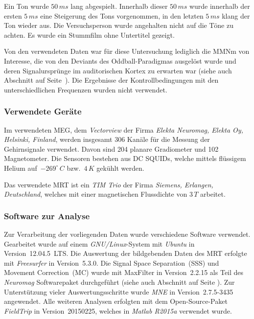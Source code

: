 \documentclass[doc,a4paper,12pt]{apa6}
\makeatletter
\DeclareRobustCommand*{\nameref}[1]{%
      \glqq{\myorg@nameref{#1}}\grqq%
    }%
\makeatother
\begin{document}
Ein Ton wurde $50\,ms$ lang abgespielt. Innerhalb dieser $50\,ms$ wurde innerhalb der ersten $5\,ms$ eine Steigerung des Tons vorgenommen, in den letzten $5\,ms$ klang der Ton wieder aus. Die Versuchsperson wurde angehalten nicht auf die Töne zu achten. Es wurde ein Stummfilm ohne Untertitel gezeigt.

Von den verwendeten Daten war für diese Untersuchung lediglich die MMNm von Interesse, die von den Deviants des Oddball-Paradigmas ausgelöst wurde und deren Signalursprünge im auditorischen Kortex zu erwarten war (siehe auch Abschnitt \nameref{sec:audicort} auf Seite~\pageref{sec:audicort}). Die Ergebnisse der Kontrollbedingungen mit den unterschiedlichen Frequenzen wurden nicht verwendet.

\subsubsection{Verwendete Geräte}

Im verwendeten MEG, dem \emph{Vectorview} der Firma \emph{Elekta Neuromag, Elekta Oy, Helsinki, Finland}, werden insgesamt 306 Kanäle für die Messung der Gehirnsignale verwendet. Davon sind 204 planare Gradiometer und 102 Magnetometer. Die Sensoren bestehen aus DC SQUIDs, welche mittels flüssigem Helium auf~$-269^\circ\,C$ bzw.~$4\,K$ gekühlt werden.

Das verwendete MRT ist ein \emph{TIM Trio} der Firma \emph{Siemens, Erlangen, Deutschland}, welches mit einer magnetischen Flussdichte von $3\,T$ arbeitet.

\subsubsection{Software zur Analyse}
\label{sec:software}

Zur Verarbeitung der vorliegenden Daten wurde verschiedene Software verwendet. Gearbeitet wurde auf einem \emph{GNU/Linux}-System mit \emph{Ubuntu} in Version~12.04.5~LTS. Die Auswertung der bildgebenden Daten des MRT erfolgte mit \emph{Freesurfer} in Version~5.3.0. Die Signal Space Separation~(SSS) und Movement Correction~(MC) wurde mit MaxFilter in Version~2.2.15 als Teil des \emph{Neuromag} Softwarepaket durchgeführt (siehe auch Abschnitt \nameref{sec:maxfilter} auf Seite \pageref{sec:maxfilter}). Zur Unterstützung vieler Auswertungsschritte wurde \emph{MNE} in Version~2.7.5-3435 angewendet. Alle weiteren Analysen erfolgten mit dem Open-Source-Paket \emph{FieldTrip} in Version~20150225, welches in \emph{Matlab R2015a} verwendet wurde.
\end{document}
